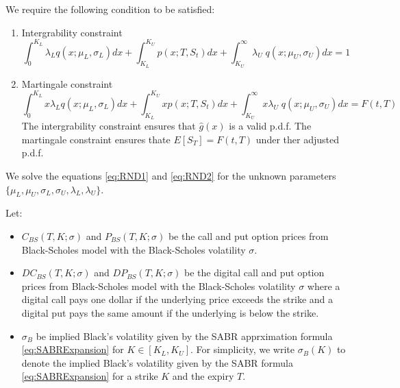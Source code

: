 \documentclass[letterpaper,12pt,titlepage,oneside,final]{book}
\numberwithin{equation}{section}
\theoremstyle{definition}
\begin{document}
We require the following condition to be satisfied:
\begin{enumerate}
\item Intergrability constraint
\begin{equation}
\int_{0}^{K_{L}}	\lambda_{L}   q(x;\mu_{L},\sigma_{L}) dx+
\int_{K_{L}}^{K_{U}}	  p(x;T,S_t)  dx+
\int_{K_{U}}^{\infty}	 \lambda_{U} \;  q(x;\mu_{U},\sigma_{U}) dx=1 
\label{eq:RND1}
\end{equation}
\item Martingale  constraint
\begin{equation}
\int_{0}^{K_{L}}	 x \lambda_{L}   q(x;\mu_{L},\sigma_{L}) dx+
\int_{K_{L}}^{K_{U}}	  x p(x;T,S_t)  dx+
\int_{K_{U}}^{\infty}	 x \lambda_{U} \;  q(x;\mu_{U},\sigma_{U}) dx=F(t,T)
\label{eq:RND2}
\end{equation}
The intergrability constraint ensures that $\hat{g}(x)$ is a valid p.d.f. The martingale  constraint ensures thate $E[S_T]=F(t,T)$ under ther adjusted p.d.f.


\end{enumerate}
We solve the equations \eqref{eq:RND1} and \eqref{eq:RND2} for the unknown parameters $\{\mu_{L}, \mu_{U},\sigma_{L},\sigma_{U}, \lambda_{L}, \lambda_{U}\}$.

Let:
\begin{itemize}
\item  $C_{BS}(T,K;\sigma)$ and $P_{BS}(T,K;\sigma)$ be the call and put option prices from Black-Scholes model with the Black-Scholes volatility $\sigma$.
\item  $DC_{BS}(T,K;\sigma)$ and $DP_{BS}(T,K;\sigma)$ be the digital call and put option prices from Black-Scholes model with the Black-Scholes  volatility $\sigma$  where a digital call pays one dollar if the underlying price exceeds the strike and a digital put pays the same amount  if the underlying is below the strike. 
\item  $\sigma_B$ be implied Black's volatility given by the SABR apprximation formula \eqref{eq:SABRExpansion} for $K \in [K_{L},K_{U}]$. For simplicity, we write $\sigma_{B}(K)$ to denote the implied Black's volatility given by the SABR formula \eqref{eq:SABRExpansion} for a strike $K$ and the expiry $T$.
 \end{itemize}
\end{document}
